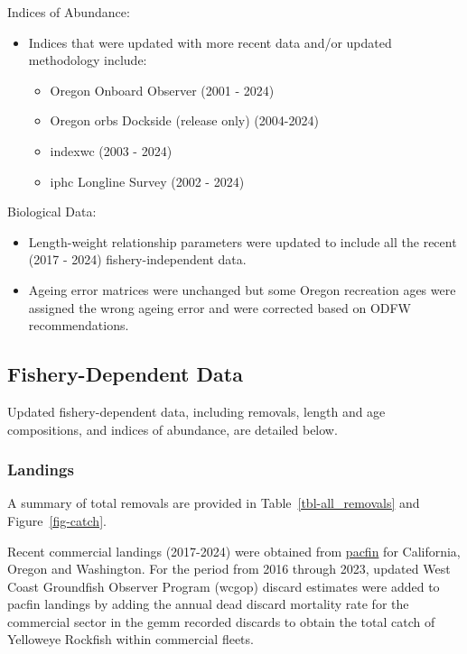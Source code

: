 \documentclass[
]{scrartcl}
\providecommand{\tightlist}{%
  \setlength{\itemsep}{0pt}\setlength{\parskip}{0pt}}\usepackage{longtable,booktabs,array}
\begin{document}
Indices of Abundance:

\begin{itemize}
\tightlist
\item
  Indices that were updated with more recent data and/or updated
  methodology include:

  \begin{itemize}
  \tightlist
  \item
    Oregon Onboard Observer (2001 - 2024)
  \item
    Oregon \gls{orbs} Dockside (release only) (2004-2024)
  \item
    \gls{indexwc} (2003 - 2024)
  \item
    \gls{iphc} Longline Survey (2002 - 2024)
  \end{itemize}
\end{itemize}

Biological Data:

\begin{itemize}
\tightlist
\item
  Length-weight relationship parameters were updated to include all the
  recent (2017 - 2024) fishery-independent data.
\item
  Ageing error matrices were unchanged but some Oregon recreation ages
  were assigned the wrong ageing error and were corrected based on ODFW
  recommendations.
\end{itemize}

\subsection{Fishery-Dependent Data}\label{fishery-dependent-data}

Updated fishery-dependent data, including removals, length and age
compositions, and indices of abundance, are detailed below.

\subsubsection{Landings}\label{landings}

A summary of total removals are provided in Table~\ref{tbl-all_removals}
and Figure~\ref{fig-catch}.

Recent commercial landings (2017-2024) were obtained from
\href{www.pacfin.psmfc.org}{\gls{pacfin}} for California, Oregon and
Washington. For the period from 2016 through 2023, updated West Coast
Groundfish Observer Program (\gls{wcgop}) discard estimates were added
to \gls{pacfin} landings by adding the annual dead discard mortality
rate for the commercial sector in the \gls{gemm} recorded discards to
obtain the total catch of Yelloweye Rockfish within commercial fleets.
\end{document}
